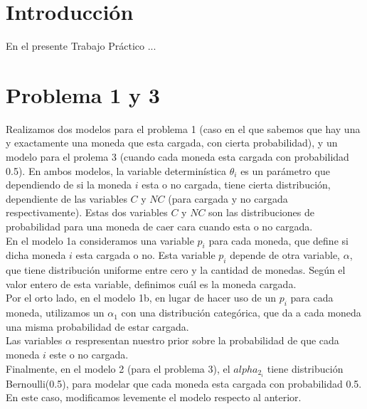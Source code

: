 \documentclass[a4paper]{article}
\begin{document}

\maketitle
\newpage

\tableofcontents
\newpage

%
\section{Introducción}
% 
En el presente Trabajo Práctico ...


\section{Problema 1 y 3}
Realizamos dos modelos para el problema 1 (caso en el que sabemos que hay una y exactamente una
moneda que esta cargada, con cierta probabilidad), y un modelo para el prolema 3 (cuando cada
moneda esta cargada con probabilidad 0.5). En ambos modelos, la variable determinística $\theta_i$ es un parámetro que dependiendo de si la moneda $i$ esta o no cargada, tiene
cierta distribución, dependiente de las variables $C$ y $NC$ (para cargada y no cargada 
respectivamente). Estas dos variables $C$ y $NC$ son las distribuciones de probabilidad para
una moneda de caer cara cuando esta o no cargada. \\
En el modelo 1a consideramos una variable $p_i$ para 
cada moneda, que define si dicha moneda $i$ esta cargada o no. Esta variable $p_i$ depende de
otra variable, $\alpha$, que tiene distribución uniforme entre cero y la cantidad de monedas. Según el valor entero de esta variable, definimos cuál es la moneda cargada. \\
Por el orto lado, en el modelo 1b, en lugar de hacer uso de un $p_i$ para cada moneda, 
utilizamos un $\alpha_1$ con una distribución categórica, que da a cada moneda una misma
probabilidad de estar cargada. \\
Las variables $\alpha$ respresentan nuestro prior sobre la probabilidad de que cada moneda $i$
este o no cargada. \\
Finalmente, en el modelo 2 (para el problema 3), el $alpha_{2_i}$ tiene distribución 
Bernoulli(0.5), para modelar que cada moneda esta cargada con probabilidad 0.5. En este caso, modificamos levemente el modelo respecto al anterior. \\
\end{document}
